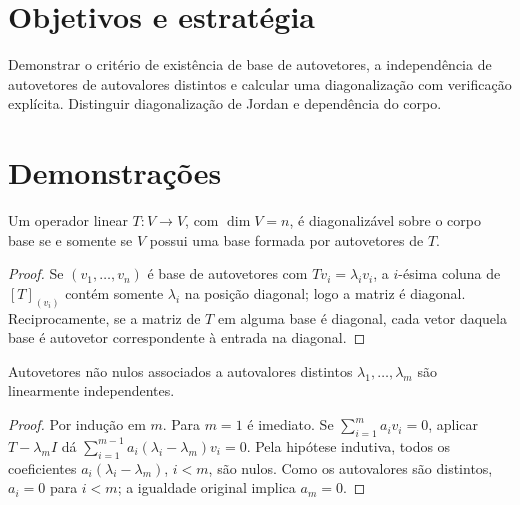 \documentclass[11pt,a4paper]{article}
\begin{document}
\section{Objetivos e estratégia}
Demonstrar o critério de existência de base de autovetores, a independência de autovetores de autovalores distintos e calcular uma diagonalização com verificação explícita. Distinguir diagonalização de Jordan e dependência do corpo.
\section{Demonstrações}
\begin{teorema}
Um operador linear $T:V\to V$, com $\dim V=n$, é diagonalizável sobre o corpo base se e somente se $V$ possui uma base formada por autovetores de $T$.
\end{teorema}
\begin{proof}
Se $(v_1,\dots,v_n)$ é base de autovetores com $Tv_i=\lambda_i v_i$, a $i$-ésima coluna de $[T]_{(v_i)}$ contém somente $\lambda_i$ na posição diagonal; logo a matriz é diagonal. Reciprocamente, se a matriz de $T$ em alguma base é diagonal, cada vetor daquela base é autovetor correspondente à entrada na diagonal.
\end{proof}
\begin{proposicao}
Autovetores não nulos associados a autovalores distintos $\lambda_1,\dots,\lambda_m$ são linearmente independentes.
\end{proposicao}
\begin{proof}
Por indução em $m$. Para $m=1$ é imediato. Se $\sum_{i=1}^m a_i v_i=0$, aplicar $T-\lambda_m I$ dá
$\sum_{i=1}^{m-1}a_i(\lambda_i-\lambda_m)v_i=0$. Pela hipótese indutiva, todos os coeficientes $a_i(\lambda_i-\lambda_m)$, $i<m$, são nulos. Como os autovalores são distintos, $a_i=0$ para $i<m$; a igualdade original implica $a_m=0$.
\end{proof}
\end{document}

